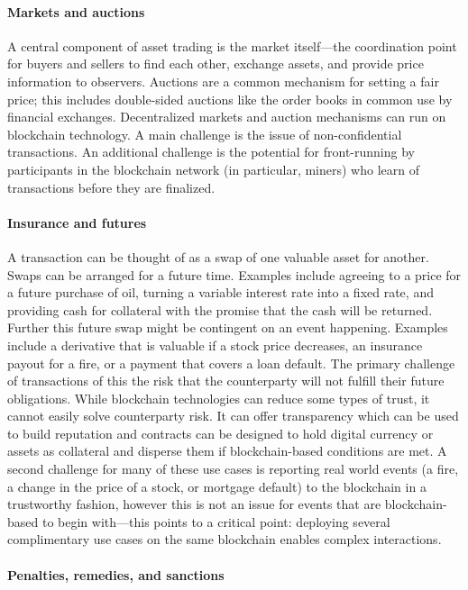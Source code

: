 \paragraph{Markets and auctions}

A central component of asset trading is the market itself---the coordination point for buyers and sellers to find each other, exchange assets, and provide price information to observers.
Auctions are a common mechanism for setting a fair price; this includes double-sided auctions like the order books in common use by financial exchanges. 
Decentralized markets and auction mechanisms can run on blockchain technology.
A main challenge is the issue of non-confidential transactions. 
An additional challenge is the potential for front-running by participants in the blockchain network (in particular, miners) who learn of transactions before they are finalized. 

\paragraph{Insurance and futures}

A transaction can be thought of as a swap of one valuable asset for another. Swaps can be arranged for a future time.
Examples include agreeing to a price for a future purchase of oil, turning a variable interest rate into a fixed rate, and providing cash for collateral with the promise that the cash will be returned.
Further this future swap might be contingent on an event happening. 
Examples include a derivative that is valuable if a stock price decreases, an insurance payout for a fire, or a payment that covers a loan default.
The primary challenge of transactions of this the risk that the counterparty will not fulfill their future obligations. While blockchain technologies can reduce some types of trust, it cannot easily solve counterparty risk. 
It can offer transparency which can be used to build reputation and contracts can be designed to hold digital currency or assets as collateral and disperse them if blockchain-based conditions are met.
A second challenge for many of these use cases is reporting real world events (a fire, a change in the price of a stock, or mortgage default) to the blockchain in a trustworthy fashion, however this is not an issue for events that are blockchain-based to begin with---this points to a critical point: deploying several complimentary use cases on the same blockchain enables complex interactions. 

\paragraph{Penalties, remedies, and sanctions}

